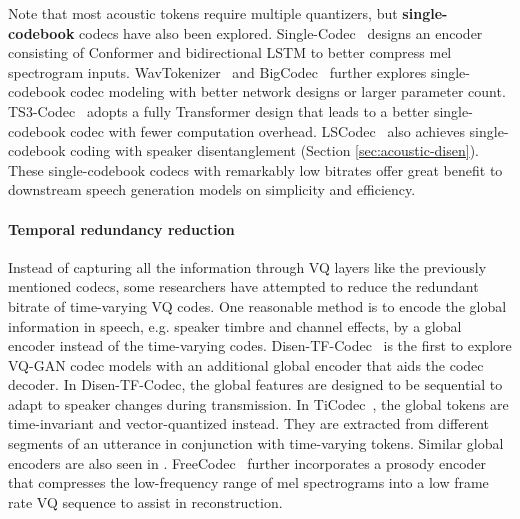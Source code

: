 Note that most acoustic tokens require multiple quantizers, but \textbf{single-codebook} codecs have also been explored.
Single-Codec~\cite{singlecodec} designs an encoder consisting of Conformer and bidirectional LSTM to better compress mel spectrogram inputs.
WavTokenizer~\cite{ji2024wavtokenizer} and BigCodec~\cite{xin2024bigcodec} further explores single-codebook codec modeling with better network designs or larger parameter count.
TS3-Codec~\cite{wu2024ts3codectransformerbasedsimplestreaming} adopts a fully Transformer design that leads to a better single-codebook codec with fewer computation overhead.
LSCodec~\cite{guo2024lscodec} also achieves single-codebook coding with speaker disentanglement (Section \ref{sec:acoustic-disen}).
These single-codebook codecs with remarkably low bitrates offer great benefit to downstream speech generation models on simplicity and efficiency.

\paragraph{Temporal redundancy reduction}

Instead of capturing all the information through VQ layers like the previously mentioned codecs, some researchers have attempted to reduce the redundant bitrate of time-varying VQ codes.
One reasonable method is to encode the global information in speech, e.g. speaker timbre and channel effects, by a global encoder instead of the time-varying codes.
Disen-TF-Codec~\cite{jiang2023disentangled} is the first to explore VQ-GAN codec models with an additional global encoder that aids the codec decoder. 
In Disen-TF-Codec, the global features are designed to be sequential to adapt to speaker changes during transmission.
In TiCodec~\cite{ticodec}, the global tokens are time-invariant and vector-quantized instead.
They are extracted from different segments of an utterance in conjunction with time-varying tokens.
Similar global encoders are also seen in \cite{guo2024socodec,guo2024speaking,singlecodec}.
FreeCodec~\cite{zheng2024freecodecdisentangledneuralspeech} further incorporates a prosody encoder~\cite{ren2022prosospeech} that compresses the low-frequency range of mel spectrograms into a low frame rate VQ sequence to assist in reconstruction.

